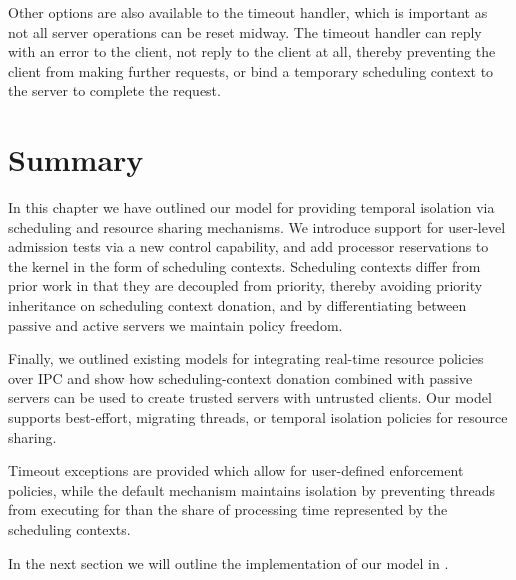 Other options are also available to the timeout handler, which is important as not all server
operations can be reset midway. The timeout handler can reply with an error to the client, 
not reply to the client at all, thereby preventing the client from making further requests, or 
bind a temporary scheduling context to the server to complete the request. 

\section{Summary}

In this chapter we have outlined our model for providing temporal isolation via scheduling and
resource sharing mechanisms. We introduce support for user-level
admission tests via a new control capability, and add processor reservations to the kernel in the form of scheduling contexts.  
Scheduling contexts differ from prior work in that they are decoupled from priority, thereby
avoiding priority inheritance on scheduling context donation, and by differentiating between passive and active servers we maintain policy freedom.

Finally, we outlined existing models for integrating real-time resource policies over \gls{IPC} and
show how scheduling-context donation combined with passive servers can be used to create trusted
servers with untrusted clients. 
Our model supports best-effort, migrating threads, or temporal isolation policies for resource sharing.

Timeout exceptions are provided which allow for user-defined enforcement policies, while the default
mechanism maintains isolation by preventing threads from executing for than the share of processing
time represented by the scheduling contexts.

In the next section we will outline the implementation of our model in \selfour. 
